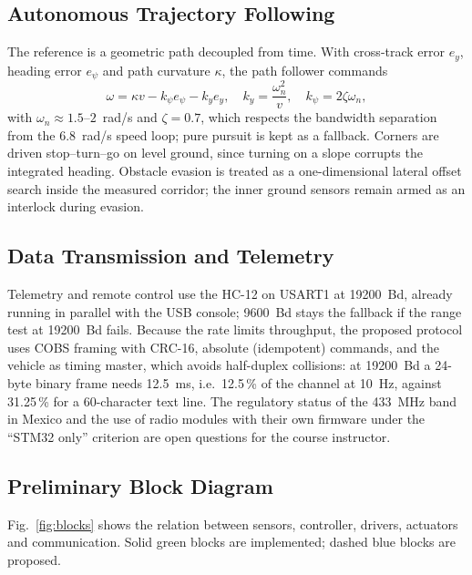 \documentclass[conference]{IEEEtran}\newcommand{\haveieee}{}%
\begin{document}
\subsection{Autonomous Trajectory Following}
The reference is a geometric path decoupled from time. With cross-track error $e_y$, heading error $e_\psi$ and path curvature $\kappa$, the path follower commands
\begin{equation}
\omega=\kappa v-k_\psi e_\psi-k_y e_y,\quad k_y=\frac{\omega_n^2}{v},\quad k_\psi=2\zeta\omega_n,
\label{eq:path}
\end{equation}
with $\omega_n\approx1.5$--$2$~rad/s and $\zeta=0.7$, which respects the bandwidth separation from the 6.8~rad/s speed loop; pure pursuit is kept as a fallback. Corners are driven stop--turn--go on level ground, since turning on a slope corrupts the integrated heading. Obstacle evasion is treated as a one-dimensional lateral offset search inside the measured corridor; the inner ground sensors remain armed as an interlock during evasion.

\subsection{Data Transmission and Telemetry}
Telemetry and remote control use the HC-12 on USART1 at 19200~Bd, already running in parallel with the USB console; 9600~Bd stays the fallback if the range test at 19200~Bd fails. Because the rate limits throughput, the proposed protocol uses COBS framing with CRC-16, absolute (idempotent) commands, and the vehicle as timing master, which avoids half-duplex collisions: at 19200~Bd a 24-byte binary frame needs 12.5~ms, i.e.\ 12.5\,\% of the channel at 10~Hz, against 31.25\,\% for a 60-character text line. The regulatory status of the 433~MHz band in Mexico and the use of radio modules with their own firmware under the ``STM32 only'' criterion are open questions for the course instructor.

\subsection{Preliminary Block Diagram}
Fig.~\ref{fig:blocks} shows the relation between sensors, controller, drivers, actuators and communication. Solid green blocks are implemented; dashed blue blocks are proposed.
\end{document}
